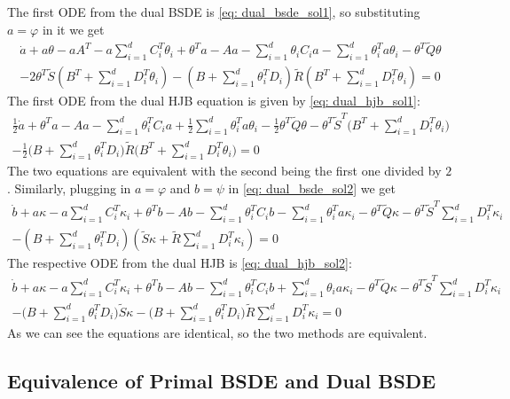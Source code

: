 The first ODE from the dual BSDE is \eqref{eq: dual_bsde_sol1}, so substituting $a = \varphi$ in it we get 
\begin{align*}
    \dot{a} + a \theta - a A^T - a \sum_{i=1}^d C_i^T \theta_i + \theta^T a - A a -\sum_{i=1}^d \theta_i C_i a - \sum_{i=1}^d\theta_i^Ta \theta_i - \theta^T \tilde{Q}\theta\\
    - 2\theta^T \tilde{S}(B^T + \sum_{i=1}^d D_i^T \theta_i) - (B + \sum_{i=1}^d\theta_i^T D_i)\tilde{R} (B^T + \sum_{i=1}^d D_i^T \theta_i) = 0
\end{align*}
The first ODE from the dual HJB equation is given by \eqref{eq: dual_hjb_sol1}:
\begin{align*}
    \frac12 \dot{a} + \theta^T a - A a  - \sum_{i=1}^d \theta_i^T C_i a + \frac12 \sum_{i=1}^d \theta_i^T a \theta_i - \frac12 \theta^T \tilde{Q}\theta - \theta^T \tilde{S}^T \big(B^T + \sum_{i=1}^d D_i^T \theta_i \big)\\
    - \frac12 \bigg(B + \sum_{i=1}^d\theta_i^T D_i\bigg) \tilde{R} \bigg(B^T + \sum_{i=1}^d D_i^T \theta_i\bigg) = 0
\end{align*}
The two equations are equivalent with the second being the first one divided by $2$. Similarly, plugging in $a = \varphi$ and $b = \psi$ in \eqref{eq: dual_bsde_sol2} we get
\begin{align*}
    \dot{b} + a \kappa - a\sum_{i=1}^d C_i^T \kappa_i + \theta^T b - A b - \sum_{i=1}^d \theta_i^T C_i b - \sum_{i=1}^d \theta_i^T a \kappa_i -\theta^T \tilde{Q} \kappa - \theta^T \tilde{S}^T\sum_{i=1}^d D_i^T\kappa_i\\
    - (B + \sum_{i=1}^d\theta_i^T D_i) (\tilde{S}\kappa + \tilde{R} \sum_{i=1}^d D_i^T \kappa_i) = 0
\end{align*}
The respective ODE from the dual HJB is \eqref{eq: dual_hjb_sol2}:
\begin{align*}
    \dot{b} + a \kappa - a \sum_{i=1}^d C_i^T \kappa_i + \theta^T b - Ab - \sum_{i=1}^d \theta_i^T C_i b 
    + \sum_{i=1}^d\theta_i a \kappa_i - \theta^T \tilde{Q} \kappa - \theta^T \tilde{S}^T \sum_{i=1}^d D_i^T \kappa_i\\
    - \big(B + \sum_{i=1}^d\theta_i^T D_i \big)\tilde{S}\kappa - \big( B + \sum_{i=1}^d \theta_i^T D_i \big) \tilde{R} \sum_{i=1}^dD_i^T \kappa_i = 0
\end{align*}
As we can see the equations are identical, so the two methods are equivalent. 

\subsection{Equivalence of Primal BSDE and Dual BSDE}